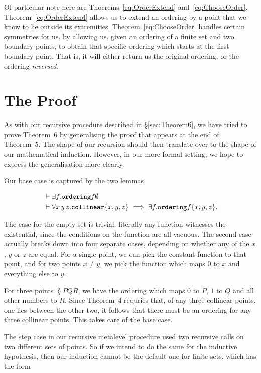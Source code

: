 Of particular note here are Thoerems~\eqref{eq:OrderExtend} and~\eqref{eq:ChooseOrder}. Theorem~\eqref{eq:OrderExtend} allows us to extend an ordering by a point that we know to lie outside its extremities. Theorem~\eqref{eq:ChooseOrder} handles certain symmetries for us, by allowing us, given an ordering of a finite set and two boundary points, to obtain that specific ordering which starts at the first boundary point. That is, it will either return us the original ordering, or the ordering \emph{reversed}.

\section{The Proof}
As with our recursive procedure described in \S\ref{sec:Theorem6}, we have tried to prove Theorem~6 by generalising the proof that appears at the end of Theorem~5. The shape of our recursion should then translate over to the shape of our mathematical induction. However, in our more formal setting, we hope to express the generalisation more clearly. 

Our base case is captured by the two lemmas

\begin{align*}
&\vdash \exists f. \texttt{ordering}{f}{\emptyset}\\
&\vdash \forall x\,y\,z. \texttt{collinear} \{x,y,z\} \implies \exists f. \texttt{ordering}{f}{\{x,y,z\}}.
\end{align*}

The case for the empty set is trivial: literally any function witnesses the existential, since the conditions on the function are all vacuous. The second case actually breaks down into four separate cases, depending on whether any of the $x$, $y$ or $z$ are equal. For a single point, we can pick the constant function to that point, and for two points $x \neq y$, we pick the function which maps $0$ to $x$ and everything else to $y$.

For three points $\between{P}{Q}{R}$, we have the ordering which maps $0$ to $P$, $1$ to $Q$ and all other numbers to $R$. Since Theorem~4 requries that, of any three collinear points, one lies between the other two, it follows that there must be an ordering for any three collinear points. This takes care of the base case.

The step case in our recursive metalevel procedure used two recursive calls on two different sets of points. So if we intend to do the same for the inductive hypothesis, then our induction cannot be the default one for finite sets, which has the form

